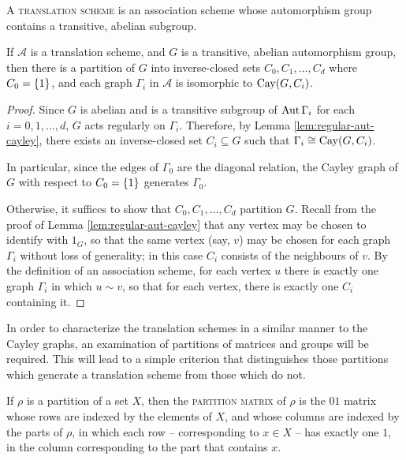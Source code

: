 \documentclass{report}
\newcommand{\AS}{\mathcal{A}}
\begin{document}
    \begin{defn}\label{defn:translation-scheme}
      A \textsc{translation scheme} is an association scheme whose
      automorphism group contains a transitive, abelian subgroup.
    \end{defn}

    \begin{lem}\label{lem:translation-partition}
      If $\AS$ is a translation scheme,
      and $G$ is a transitive, abelian automorphism group,
      then there is a partition of $G$ into inverse-closed sets
      $C_0, C_1, \ldots, C_d$ where $C_0 = \left\lbrace 1 \right\rbrace$,
      and each graph $\Gamma_i$ in $\AS$ is isomorphic to $\operatorname{Cay}(G, C_i)$.
    \end{lem}

    \begin{proof}
      Since $G$ is abelian and is a transitive subgroup of $\operatorname{Aut} \Gamma_i$ for
      each $i = 0, 1, \ldots, d$, $G$ acts regularly on $\Gamma_i$.
      Therefore, by Lemma \ref{lem:regular-aut-cayley}, there exists an inverse-closed
      set $C_i \subseteq G$ such that $\Gamma_i \cong \operatorname{Cay}(G, C_i)$.

      In particular, since the edges of $\Gamma_0$ are the diagonal relation,
      the Cayley graph of $G$ with respect to $C_0 = \left\lbrace 1 \right\rbrace$ generates
      $\Gamma_0$.

      Otherwise, it suffices to show that $C_0, C_1, \ldots, C_d$ partition $G$.
      Recall from the proof of Lemma \ref{lem:regular-aut-cayley} that any vertex may be
      chosen to identify with $1_G$, so that the same vertex (say, $v$)
      may be chosen for each graph $\Gamma_i$ without loss of generality;
      in this case $C_i$ consists of the neighbours of $v$.  By the definition
      of an association scheme, for each vertex $u$ there is exactly one
      graph $\Gamma_i$ in which $u \sim v$, so that for each vertex, there is
      exactly one $C_i$ containing it.
    \end{proof}

    In order to characterize the translation schemes in a similar manner to the
    Cayley graphs, an examination of partitions of matrices and groups will be
    required.  This will lead to a simple criterion that distinguishes those
    partitions which generate a translation scheme from those
    which do not.  \cite[Section~12.10]{godsil}

    \begin{defn}\label{defn:partition-matrix}
      If $\rho$ is a partition of a set $X$,
      then the \textsc{partition matrix} of $\rho$
      is the $01$ matrix
      whose rows are indexed by the elements of $X$,
      and whose columns are indexed by the parts of $\rho$,
      in which each row -- corresponding to $x \in X$ -- has exactly one $1$,
      in the column corresponding to the part that contains $x$.
    \end{defn}
\end{document}
